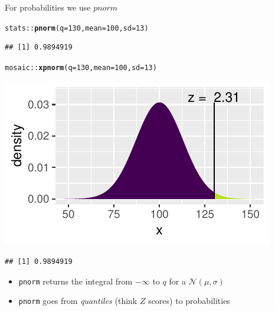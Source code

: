 \documentclass[handout]{beamer}\usepackage[]{graphicx}\usepackage[]{color}
\newcommand{\hlnum}[1]{\textcolor[rgb]{0.686,0.059,0.569}{#1}}%
\newcommand{\hlopt}[1]{\textcolor[rgb]{0,0,0}{#1}}%
\newcommand{\hlstd}[1]{\textcolor[rgb]{0.345,0.345,0.345}{#1}}%
\newcommand{\hlkwc}[1]{\textcolor[rgb]{0.333,0.667,0.333}{#1}}%
\newcommand{\hlkwd}[1]{\textcolor[rgb]{0.737,0.353,0.396}{\textbf{#1}}}%
\newenvironment{knitrout}{}{} %
\begin{document}
\begin{frame}[fragile]{For probabilities we use $pnorm$}


\begin{knitrout}\scriptsize
{}\color{fgcolor}
\begin{alltt}
\hlstd{stats}\hlopt{::}\hlkwd{pnorm}\hlstd{(}\hlkwc{q} \hlstd{=} \hlnum{130}\hlstd{,} \hlkwc{mean} \hlstd{=} \hlnum{100}\hlstd{,} \hlkwc{sd} \hlstd{=} \hlnum{13}\hlstd{)}
\end{alltt}
\begin{verbatim}
## [1] 0.9894919
\end{verbatim}

\end{knitrout}

\pause 

\begin{knitrout}\scriptsize
{}\color{fgcolor}
\begin{alltt}
\hlstd{mosaic}\hlopt{::}\hlkwd{xpnorm}\hlstd{(}\hlkwc{q} \hlstd{=} \hlnum{130}\hlstd{,} \hlkwc{mean} \hlstd{=} \hlnum{100}\hlstd{,} \hlkwc{sd} \hlstd{=} \hlnum{13}\hlstd{)}
\end{alltt}


{\centering \includegraphics[width=0.6\linewidth]{figure/probs3-1} 

}


\begin{verbatim}
## [1] 0.9894919
\end{verbatim}

\end{knitrout}

\pause 

\begin{itemize}
	\item \texttt{pnorm} returns the integral from $-\infty$ to $q$ for a $\mathcal{N}(\mu, \sigma)$
	\item \texttt{pnorm} goes from \textit{quantiles} (think $Z$ scores) to probabilities
\end{itemize}

\end{frame}
\end{document}
